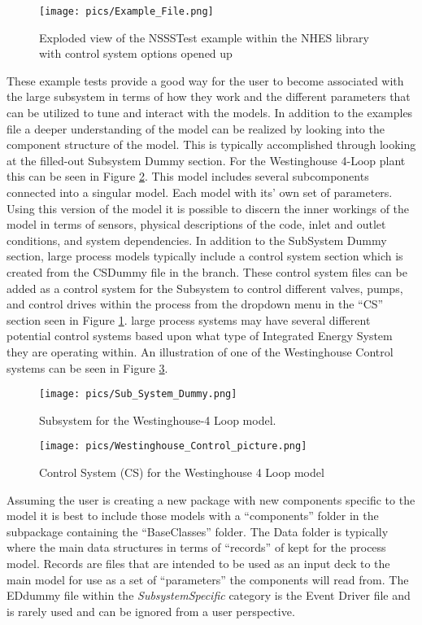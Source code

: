 \begin{figure}[hbtp]
\centering
\texttt{[image: pics/Example\_File.png]}
\caption{Exploded view of the NSSS\textunderscore Test example within the NHES library with control system options opened up }
\label{Example File}
\end{figure}

These example tests provide a good way for the user to become associated with the large subsystem in terms of how they work and the different parameters that can be utilized to tune and interact with the models. In addition to the examples file a deeper understanding of the model can be realized by looking into the component structure of the model. This is typically accomplished through looking at the filled-out Subsystem Dummy section. For the Westinghouse 4-Loop plant this can be seen in Figure \ref{Westinghouse 4-loop}. This model includes several subcomponents connected into a singular model. Each model with its’ own set of parameters. Using this version of the model it is possible to discern the inner workings of the model in terms of sensors, physical descriptions of the code, inlet and outlet conditions, and system dependencies. 
In addition to the SubSystem Dummy section, large process models typically include a control system section which is created from the CS\textunderscore Dummy file in the branch. These control system files can be added as a control system for the Subsystem to control different valves, pumps, and control drives within the process from the dropdown menu in the “CS” section seen in Figure \ref{Example File}. large process systems may have several different potential control systems based upon what type of Integrated Energy System they are operating within. An illustration of one of the Westinghouse Control systems can be seen in Figure \ref{Control System}. 


\begin{figure}[hbtp]
\centering
\texttt{[image: pics/Sub\_System\_Dummy.png]}
\caption{Subsystem for the Westinghouse-4 Loop model.}
\label{Westinghouse 4-loop}
\end{figure}


\begin{figure}[hbtp]
\centering
\texttt{[image: pics/Westinghouse\_Control\_picture.png]}
\caption{Control System (CS) for the Westinghouse 4 Loop model}
\label{Control System}
\end{figure}

Assuming the user is creating a new package with new components specific to the model it is best to include those models with a “components” folder in the subpackage containing the “BaseClasses” folder. The Data folder is typically where the main data structures in terms of “records” of kept for the process model. Records are files that are intended to be used as an input deck to the main model for use as a set of “parameters” the components will read from. The ED\textunderscore dummy file within the \textit{Subsystem\textunderscore Specific} category is the Event Driver file and is rarely used and can be ignored from a user perspective.


